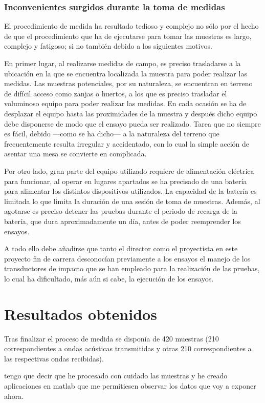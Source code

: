 \subsubsection{Inconvenientes surgidos durante la toma de medidas}

El procedimiento de medida ha resultado tedioso y complejo no sólo por el
hecho de que el procedimiento que ha de ejecutarse para tomar las muestras
es largo, complejo y fatigoso; si no también debido a los siguientes
motivos.

En primer lugar, al realizarse medidas de campo, es preciso trasladarse a
la ubicación en la que se encuentra localizada la muestra para poder
realizar las medidas. Las muestras potenciales, por su naturaleza, se
encuentran en terreno de difícil acceso como zanjas o huertos, a los que es
preciso trasladar el voluminoso equipo para poder realizar las medidas. En
cada ocasión se ha de desplazar el equipo hasta las proximidades de la
muestra y después dicho equipo debe disponerse de modo que el ensayo pueda
ser realizado. Tarea que no siempre es fácil, debido ---como se ha dicho---
a la naturaleza del terreno que frecuentemente resulta irregular y
accidentado, con lo cual la simple acción de asentar una mesa se convierte
en complicada.

Por otro lado, gran parte del equipo utilizado requiere de alimentación
eléctrica para funcionar, al operar en lugares apartados se ha precisado de
una batería para alimentar los distintos dispositivos utilizados. La
capacidad de la batería es limitada lo que limita la duración de una sesión
de toma de muestras. Además, al agotarse es preciso detener las pruebas
durante el periodo de recarga de la batería, que dura aproximadamente un
día, antes de poder reemprender los ensayos.

A todo ello debe añadirse que tanto el director como el proyectista en este
proyecto fin de carrera desconocían previamente a los ensayos el manejo de
los transductores de impacto que se han empleado para la realización de las
pruebas, lo cual ha dificultado, más aún si cabe, la ejecución de los
ensayos.


\section{Resultados obtenidos}

Tras finalizar el proceso de medida se disponía de 420 muestras (210
correspondientes a ondas acústicas transmitidas y otras 210
correspondientes a las respectivas ondas recibidas).

tengo que decir que he procesado con cuidado las muestras y he creado
aplicaciones en matlab que me permitiesen observar los datos que voy a
exponer ahora.
